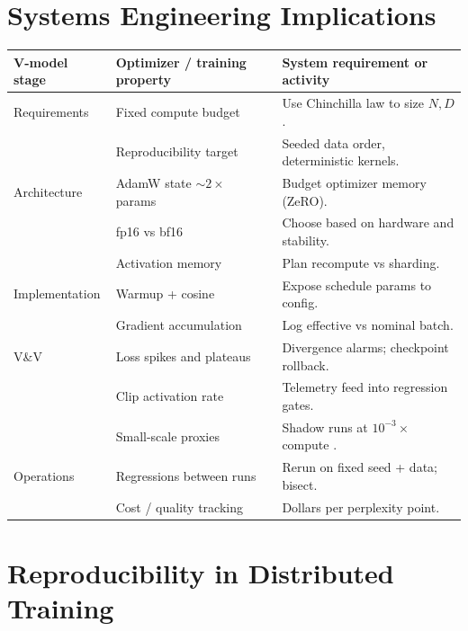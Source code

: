 \section{Systems Engineering Implications}

\begin{center}
\begin{tabular}{|p{3.4cm}|p{3.4cm}|p{6.8cm}|}
\hline
V-model stage & Optimizer / training property & System requirement or activity \\
\hline
Requirements & Fixed compute budget & Use Chinchilla law to size $N, D$. \\
 & Reproducibility target & Seeded data order, deterministic kernels. \\
\hline
Architecture & AdamW state $\sim 2\times$ params & Budget optimizer memory (ZeRO). \\
 & fp16 vs bf16 & Choose based on hardware and stability. \\
 & Activation memory & Plan recompute vs sharding. \\
\hline
Implementation & Warmup + cosine & Expose schedule params to config. \\
 & Gradient accumulation & Log effective vs nominal batch. \\
\hline
V\&V & Loss spikes and plateaus & Divergence alarms; checkpoint rollback. \\
 & Clip activation rate & Telemetry feed into regression gates. \\
 & Small-scale proxies & Shadow runs at $10^{-3}\times$ compute
   \citep{wortsman2023stable}. \\
\hline
Operations & Regressions between runs & Rerun on fixed seed + data; bisect. \\
 & Cost / quality tracking & Dollars per perplexity point. \\
\hline
\end{tabular}
\end{center}

\section{Reproducibility in Distributed Training}

